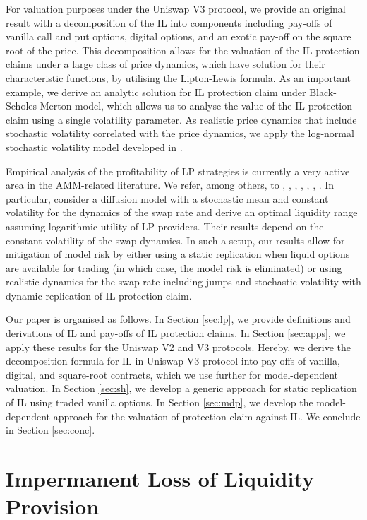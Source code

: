 \documentclass[pdftex,11pt,a4paper] {article}
\begin{document}
For valuation purposes under the Uniswap V3 protocol, we provide an original
result with a decomposition of the IL into components including pay-offs of
vanilla call and put options, digital options, and an exotic pay-off on the
square root of the price. This decomposition allows for the valuation of the
IL protection claims under a large class of price dynamics, which have
solution for their characteristic functions, by utilising the Lipton-Lewis
formula. As an important example, we derive an analytic solution for IL
protection claim under Black-Scholes-Merton model, which allows us to analyse
the value of the IL protection claim using a single volatility parameter. As
realistic price dynamics that include stochastic volatility correlated with the
price dynamics, we apply the log-normal stochastic volatility model
developed in \citet{SeppRakhmonoV2023}.

Empirical analysis of the profitability of LP strategies is currently a very active area
in the AMM-related literature. We refer, among others, to
\citet{Heimbach2022}, \citet{Cartea2023}, \citet{Bergault2023}, %
\citet{Cartea2024}, \citet{Li2023}, \citet{Li2024}, \citet{Bronnimann2024}. In particular, \citet{Cartea2024} consider a diffusion model with a stochastic mean and constant volatility for the dynamics of the swap rate and derive an optimal liquidity range assuming logarithmic utility of LP providers. Their results depend on the constant volatility of the swap dynamics. In such a setup, our results allow for mitigation of model risk by either using a static replication when liquid options are available for trading (in which case, the model risk is eliminated) or using realistic dynamics for the swap rate including jumps and stochastic volatility with dynamic replication of IL protection claim.

Our paper is organised as follows. In Section \ref{sec:lp}, we provide
definitions and derivations of IL and pay-offs of IL protection claims.
In Section \ref{sec:apps}, we apply these results for the Uniswap V2 and V3
protocols. Hereby, we derive the decomposition formula for IL in Uniswap V3
protocol into pay-offs of vanilla, digital, and square-root contracts, which
we use further for model-dependent valuation. In Section \ref{sec:sh}, we
develop a generic approach for static replication of IL using traded vanilla
options. In Section \ref{sec:mdp}, we develop the model-dependent approach
for the valuation of protection claim against IL. We conclude in Section \ref{sec:conc}.

\section{Impermanent Loss of Liquidity Provision}
\end{document}
